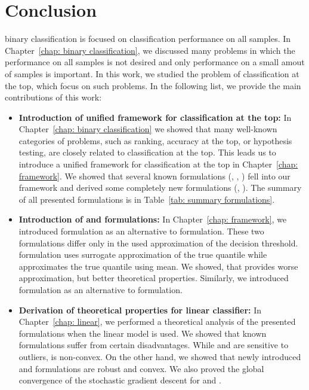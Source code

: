 \chapter*{Conclusion}

binary classification is focused on classification performance on all samples. In Chapter~\ref{chap: binary classification}, we discussed many problems in which the performance on all samples is not desired and only performance on a small amout of samples is important.  In this work, we studied the problem of classification at the top, which focus on such problems. In the following list, we provide the main contributions of this work:
\begin{itemize}
  \item \textbf{Introduction of unified framework for classification at the top:} In Chapter~\ref{chap: binary classification} we showed that many well-known categories of problems, such as ranking, accuracy at the top, or hypothesis testing, are closely related to classification at the top. This leads us to introduce a unified framework for classification at the top in Chapter~\ref{chap: framework}. We showed that several known formulations (\TopPush, \Grill, \tauFPL) fell into our framework and derived some completely new formulations (\PatMat, \PatMatNP). The summary of all presented formulations is in Table~\ref{tab: summary formulations}.
  \item \textbf{Introduction of \PatMat and \PatMatNP formulations:} In Chapter~\ref{chap: framework}, we introduced \PatMat formulation as an alternative to \TopMeanK formulation. These two formulations differ only in the used approximation of the decision threshold. \PatMat formulation uses surrogate approximation of the true quantile while \TopMeanK approximates the true quantile using mean. We showed, that \PatMat provides worse approximation, but better theoretical properties. Similarly, we introduced \PatMatNP formulation as an alternative to \tauFPL formulation.
  \item \textbf{Derivation of theoretical properties for linear classifier:} In Chapter~\ref{chap: linear}, we performed a theoretical analysis of the presented formulations when the linear model is used. We showed that known formulations suffer from certain disadvantages. While \TopPush and \tauFPL are sensitive to outliers, \Grill is non-convex. On the other hand, we showed that newly introduced \PatMat and \PatMatNP formulations are robust and convex. We also proved the global convergence of the stochastic gradient descent for \PatMat and \PatMatNP.

\end{itemize}
